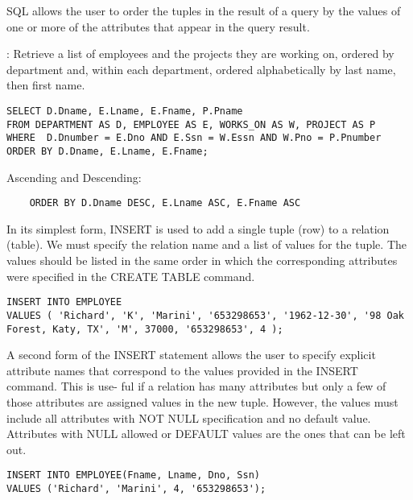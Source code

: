     \par SQL allows the user to order the tuples in the result of a query by the values of one or more of the attributes that appear in the query result.
    \par {}: Retrieve a list of employees and the projects they are working on, ordered by department and, within each department, ordered alphabetically by last name, then first name.
      \begin{verbatim}
SELECT D.Dname, E.Lname, E.Fname, P.Pname
FROM DEPARTMENT AS D, EMPLOYEE AS E, WORKS_ON AS W, PROJECT AS P
WHERE  D.Dnumber = E.Dno AND E.Ssn = W.Essn AND W.Pno = P.Pnumber
ORDER BY D.Dname, E.Lname, E.Fname;
      \end{verbatim}
    \par Ascending and Descending:
       \begin{verbatim}
    ORDER BY D.Dname DESC, E.Lname ASC, E.Fname ASC
      \end{verbatim}


    \par In its simplest form, INSERT is used to add a single tuple (row) to a relation (table). We must specify the relation name and a list of values for the tuple. The values should be listed in the same order in which the corresponding attributes were specified in the CREATE TABLE command.

      \begin{verbatim}
INSERT INTO EMPLOYEE
VALUES ( 'Richard', 'K', 'Marini', '653298653', '1962-12-30', '98 Oak Forest, Katy, TX', 'M', 37000, '653298653', 4 );
      \end{verbatim}

    \par A second form of the INSERT statement allows the user to specify explicit attribute
    names that correspond to the values provided in the INSERT command. This is use-
    ful if a relation has many attributes but only a few of those attributes are assigned
    values in the new tuple. However, the values must include all attributes with NOT
    NULL specification and no default value. Attributes with NULL allowed or DEFAULT
    values are the ones that can be left out.

      \begin{verbatim}
INSERT INTO EMPLOYEE(Fname, Lname, Dno, Ssn)
VALUES ('Richard', 'Marini', 4, '653298653');
      \end{verbatim}

